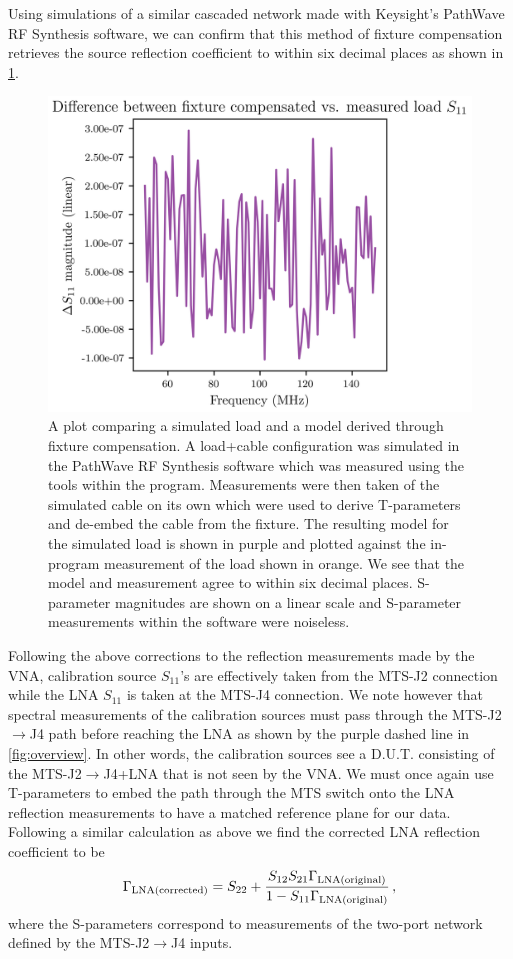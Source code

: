 Using simulations of a similar cascaded network made with Keysight’s PathWave RF Synthesis software, we can confirm that this method of fixture compensation retrieves the source reflection coefficient to within six decimal places as shown in \cref{fig:tparam}.
\begin{figure}
    \centering
    \includegraphics[width=.7\textwidth]{tparam}
    \caption{A plot comparing a simulated load and a model derived through fixture compensation. A load+cable configuration was simulated in the PathWave RF Synthesis software which was measured using the tools within the program. Measurements were then taken of the simulated cable on its own which were used to derive T-parameters and de-embed the cable from the fixture. The resulting model for the simulated load is shown in purple and plotted against the in-program measurement of the load shown in orange. We see that the model and measurement agree to within six decimal places. S-parameter magnitudes are shown on a linear scale and S-parameter measurements within the software were noiseless.}
    \label{fig:tparam}
\end{figure}

Following the above corrections to the reflection measurements made by the VNA, calibration source $S_{11}$’s are effectively taken from the MTS-J2 connection while the LNA $S_{11}$ is taken at the MTS-J4 connection. We note however that spectral measurements of the calibration sources must pass through the MTS-J2$\rightarrow$J4 path before reaching the LNA as shown by the purple dashed line in \cref{fig:overview}. In other words, the calibration sources see a D.U.T. consisting of the MTS-J2$\rightarrow$J4+LNA that is not seen by the VNA. We must once again use T-parameters to embed the path through the MTS switch onto the LNA reflection measurements to have a matched reference plane for our data. Following a similar calculation as above we find the corrected LNA reflection coefficient to be
\begin{equation}
    \Gamma_{\mathrm{\mathrm{LNA (corrected)}}} = S_{22} + \frac{S_{12}S_{21}\Gamma_{\mathrm{\mathrm{LNA (original)}}}}{1 - S_{11}\Gamma_{\mathrm{\mathrm{LNA (original)}}}} \,,
\end{equation}
where the S-parameters correspond to measurements of the two-port network defined by the MTS-J2$\rightarrow$J4 inputs.

